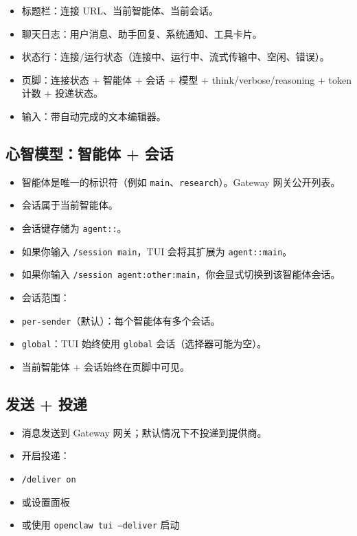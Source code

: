\begin{itemize}
  \item 标题栏：连接 URL、当前智能体、当前会话。
  \item 聊天日志：用户消息、助手回复、系统通知、工具卡片。
  \item 状态行：连接/运行状态（连接中、运行中、流式传输中、空闲、错误）。
  \item 页脚：连接状态 + 智能体 + 会话 + 模型 + think/verbose/reasoning + token 计数 + 投递状态。
  \item 输入：带自动完成的文本编辑器。
\end{itemize}


\subsection{心智模型：智能体 + 会话}


\begin{itemize}
  \item 智能体是唯一的标识符（例如 \texttt{main}、\texttt{research}）。Gateway 网关公开列表。
  \item 会话属于当前智能体。
  \item 会话键存储为 \texttt{agent::}。
  \item 如果你输入 \texttt{/session main}，TUI 会将其扩展为 \texttt{agent::main}。
  \item 如果你输入 \texttt{/session agent:other:main}，你会显式切换到该智能体会话。
  \item 会话范围：
  \item \texttt{per-sender}（默认）：每个智能体有多个会话。
  \item \texttt{global}：TUI 始终使用 \texttt{global} 会话（选择器可能为空）。
  \item 当前智能体 + 会话始终在页脚中可见。
\end{itemize}


\subsection{发送 + 投递}


\begin{itemize}
  \item 消息发送到 Gateway 网关；默认情况下不投递到提供商。
  \item 开启投递：
  \item \texttt{/deliver on}
  \item 或设置面板
  \item 或使用 \texttt{openclaw tui --deliver} 启动
\end{itemize}


